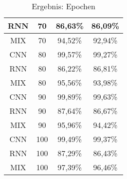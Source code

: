 \begin{table}[H]
\begin{tabular}{|c|c|c|c|}
                \hline
                RNN & 70 &  86,63\% & 86,09\%  \\ 
                \hline
                MIX & 70 &  94,52\% & 92,94\%  \\ 
                \hline
                \hline
                CNN & 80 &  99,57\% & 99,27\%  \\ 
                \hline
                RNN & 80 &  86,22\% & 86,81\%  \\ 
                \hline
                MIX & 80 &  95,56\% & 93,98\%  \\ 
                \hline
                \hline
                CNN & 90 &  99,89\% & 99,63\%  \\ 
                \hline
                RNN & 90 &  87,64\% & 86,67\%  \\ 
                \hline
                MIX & 90 &  95,96\% & 94,42\%  \\ 
                \hline
                \hline
                CNN & 100 & 99,49\% & 99,37\%  \\ 
                \hline
                RNN & 100 & 87,29\% & 86,43\%  \\ 
                \hline
                MIX & 100 & 97,39\% & 96,46\% \\
                \hline

            \end{tabular}
            \caption{Ergebnis: Epochen}
            \label{tabl:ErgebnisEpoch}
        \end{table}
